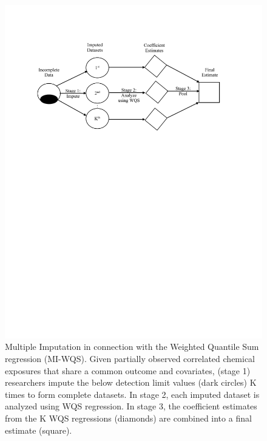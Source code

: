 \begin{figure}[h]

{\centering \includegraphics[width=1\linewidth]{figure-word/fig_mi_intro.pdf} 

}

\caption{\label{fig::mi} Multiple Imputation in connection with the Weighted Quantile Sum regression (MI-WQS). Given partially observed correlated chemical exposures that share a common outcome and covariates, (stage 1) researchers impute the below detection limit values (dark circles) K times to form complete datasets. In stage 2, each imputed dataset is analyzed using WQS regression. In stage 3, the coefficient estimates from the K WQS regressions (diamonds) are combined into a final estimate (square).}\label{fig:fig.mi}
\end{figure}

